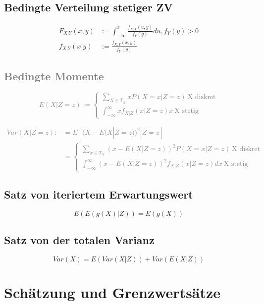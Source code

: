 \documentclass[10pt,a4paper,landscape]{article}
\begin{document}
\begin{multicols}{4}
\subsection{Bedingte Verteilung stetiger ZV}
\begin{align*}
F_{X|Y}(x,y) &:= \int_{- \infty}^x\frac{f_{X,Y}(u,y)}{f_Y(y)}du, f_Y(y) > 0 \\
f_{X|Y}(x|y) &:= \frac{f_{X,Y}(x,y)}{f_Y(y)}
\end{align*}

\textcolor{gray}{\subsection{Bedingte Momente}
\[
E(X|Z=z) := \begin{cases}
\sum_{X \in T_X} xP(X=x|Z=z) ~ \text{X diskret} \\
\int_{- \infty}^{\infty}xf_{X|Z}(x|Z=z)x ~ \text{X stetig}
\end{cases}
\]
}

\textcolor{gray}{
\begin{align*}
Var(X|Z=z) :&= E[(X-E(X|Z=z))^2|Z=z] \\
&= \begin{cases}
\sum_{x \in T_X}(x-E(X|Z=z))^2P(X=x|Z=z) ~ \text{X diskret} \\
\int_{-\infty}^{\infty}(x-E(X|Z=z))^2f_{X|Z}(x|Z=z)dx ~ \text{X stetig}
\end{cases}
\end{align*}
}

\subsection{Satz von iteriertem Erwartungswert}
\[
E(E(g(X)|Z)) = E(g(X))
\] 

\subsection{Satz von der totalen Varianz}
\[
Var(X) = E(Var(X|Z))+Var(E(X|Z))
\]


\section{Schätzung und Grenzwertsätze}


\end{multicols}
\end{document}
